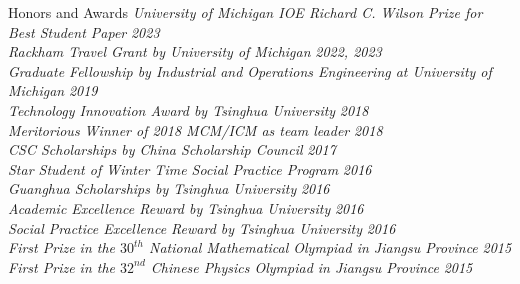 \documentclass{resume}
\begin{document}
\begin{rSection}{Honors and Awards} 
{\em University of Michigan IOE Richard C. Wilson Prize for Best Student Paper} \hfill {\em 2023}\\
{\em Rackham Travel Grant by University of Michigan} \hfill {\em 2022, 2023}\\
{\em Graduate Fellowship by Industrial and Operations Engineering at University of Michigan} \hfill {\em 2019}\\
 {\em Technology Innovation Award by Tsinghua University} \hfill {\em 2018}\\
 {\em Meritorious Winner of 2018 MCM/ICM as team leader} \hfill {\em 2018}\\
 {\em CSC Scholarships by China Scholarship Council} \hfill {\em 2017}\\
 {\em Star Student of Winter Time Social Practice Program} \hfill {\em 2016}\\
 {\em Guanghua Scholarships by Tsinghua University} \hfill {\em 2016}\\
 {\em Academic Excellence Reward by Tsinghua University} \hfill {\em 2016}\\
 {\em Social Practice Excellence Reward by Tsinghua University} \hfill {\em 2016}\\
 {\em First Prize in the $30^{th}$ National Mathematical Olympiad in Jiangsu Province} \hfill {\em 2015}\\
 {\em First Prize in the $32^{nd}$ Chinese Physics Olympiad in Jiangsu Province} \hfill {\em 2015}
\end{rSection}
\end{document}
